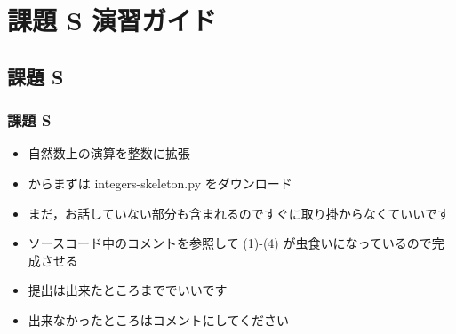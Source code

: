 %
%
\section{課題 S 演習ガイド}
\subsection{課題 S}
\begin{frame}[containsverbatim, shrink, label=quizS]
\frametitle{課題 S}
  \begin{itemize}
\item 自然数上の演算を整数に拡張
\item \href{https://sites.google.com/a/presystems.xyz/sample/home/elementary-computer-science}{} からまずは integers-skeleton.py をダウンロード
\item まだ，お話していない部分も含まれるのですぐに取り掛からなくていいです
\item ソースコード中のコメントを参照して (1)-(4) が虫食いになっているので完成させる
\item 提出は出来たところまででいいです
\item 出来なかったところはコメントにしてください
  \end{itemize}
\end{frame}
